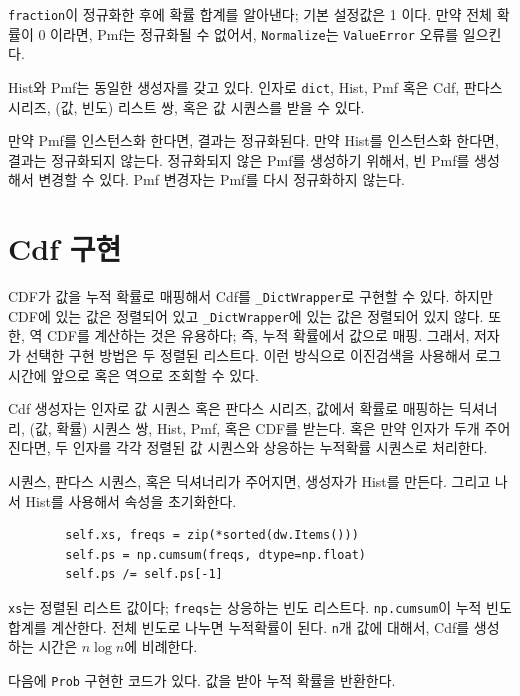 {\tt fraction}이 정규화한 후에 확률 합계를 알아낸다; 기본 설정값은 1 이다.
만약 전체 확률이 0 이라면, Pmf는 정규화될 수 없어서, {\tt Normalize}는 {\tt ValueError} 오류를 일으킨다.

Hist와 Pmf는 동일한 생성자를 갖고 있다.
인자로 {\tt dict}, Hist, Pmf 혹은 Cdf, 
판다스 시리즈, (값, 빈도) 리스트 쌍, 혹은 값 시퀀스를 받을 수 있다.

만약 Pmf를 인스턴스화 한다면, 결과는 정규화된다.
만약 Hist를 인스턴스화 한다면, 결과는 정규화되지 않는다.
정규화되지 않은 Pmf를 생성하기 위해서, 빈 Pmf를  생성해서 변경할 수 있다. Pmf 변경자는 Pmf를 다시 정규화하지 않는다.

\section{Cdf 구현}

CDF가 값을 누적 확률로 매핑해서 Cdf를 \verb"_DictWrapper"로 구현할 수 있다. 하지만 CDF에 있는 값은 정렬되어 있고 \verb"_DictWrapper"에 있는 값은 정렬되어 있지 않다.
또한, 역 CDF를 계산하는 것은 유용하다; 즉, 누적 확률에서 값으로 매핑. 그래서, 저자가 선택한 구현 방법은 두 정렬된 리스트다.
이런 방식으로 이진검색을 사용해서 로그 시간에 앞으로 혹은 역으로 조회할 수 있다.


Cdf 생성자는 인자로 값 시퀀스 혹은 판다스 시리즈, 값에서 확률로 매핑하는 딕셔너리, (값, 확률) 시퀀스 쌍, Hist, Pmf, 혹은 CDF를 받는다. 혹은 만약 인자가 두개 주어진다면, 두 인자를 각각 정렬된 값 시퀀스와 상응하는 누적확률 시퀀스로 처리한다.

시퀀스, 판다스 시퀀스, 혹은 딕셔너리가 주어지면, 생성자가 Hist를 만든다. 그리고 나서 Hist를 사용해서 속성을 초기화한다.

\begin{verbatim}
        self.xs, freqs = zip(*sorted(dw.Items()))
        self.ps = np.cumsum(freqs, dtype=np.float)
        self.ps /= self.ps[-1]
\end{verbatim}

{\tt xs}는 정렬된 리스트 값이다; {\tt freqs}는 상응하는 빈도 리스트다. {\tt np.cumsum}이 누적 빈도 합계를 계산한다. 
전체 빈도로 나누면 누적확률이 된다.
{\tt n}개 값에 대해서, Cdf를 생성하는 시간은 $n \log n$에 비례한다.

다음에 {\tt Prob} 구현한 코드가 있다. 값을 받아 누적 확률을 반환한다.

